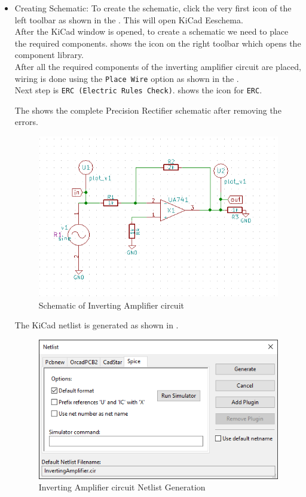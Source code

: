 \begin{itemize}
\item Creating Schematic:
To create the schematic, click the very first icon of the left toolbar as shown in the . This will open KiCad Eeschema.\\
After the KiCad window is opened, to create a schematic we need to place the required components.  shows the icon on the right toolbar which opens the component library.\\
After all the required components of the inverting amplifier circuit are placed, wiring is done using the {\tt Place Wire} option as shown in the .\\
Next step is {\tt ERC (Electric Rules Check)}.  shows the icon for {\tt ERC}.

The  shows the complete Precision Rectifier schematic after removing the errors.

\begin{figure}[!htp]
    \centering
    \includegraphics[width=\hgfig]{figures/ia_schematic.png}
    \caption{Schematic of Inverting Amplifier circuit}
    \label{ia_schematic}
\end{figure}

The KiCad netlist is generated as shown in .\\
\begin{figure}[!htp]
    \centering
    \includegraphics[width=\lgfig]{figures/ia_netlistgeneration.png}
    \caption{Inverting Amplifier circuit Netlist Generation}
    \label{ia_netlistgeneration}
\end{figure}



\end{itemize}
